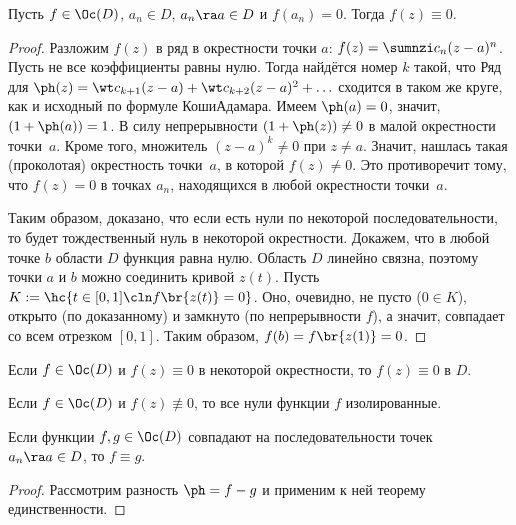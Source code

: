 \documentclass[a4paper]{article}
\begin{document}
\begin{theorem}[единственности]
Пусть $f \in \Oc(D)$, $a_{n} \in D$, $a_n \ra a \in D$ и $f(a_n)=0$. Тогда $f(z) \equiv 0$.
\end{theorem}
\begin{proof}
Разложим $f(z)$ в ряд в окрестности точки $a$: $f(z)=\sumnzi c_n(z-a)^n$.
Пусть не все коэффициенты равны нулю. Тогда найдётся номер $k$ такой, что
Ряд для $\ph(z) = \wt c_{k+1}(z-a) + \wt c_{k+2}(z-a)^2 + \ldots$ сходится в таком же круге, как и исходный
по формуле Коши\ч Адамара. Имеем $\ph(a) = 0$, значит, $(1+\ph(a))=1$. В силу непрерывности $(1+\ph(z))\neq 0$ в
малой окрестности точки~$a$. Кроме того, множитель $(z-a)^k \neq 0$ при $z \neq a$.
Значит, нашлась такая (проколотая) окрестность точки~$a$, в которой $f(z) \neq 0$. Это противоречит тому, что
$f(z) = 0$ в точках $a_n$, находящихся в любой окрестности точки~$a$.

Таким образом, доказано, что если есть нули по некоторой последовательности, то будет
тождественный нуль в некоторой окрестности. Докажем, что в любой точке $b$ области $D$ функция
равна нулю. Область $D$ линейно связна, поэтому точки $a$ и $b$ можно соединить кривой $z(t)$.
Пусть $K := \hc{t \in [0,1]\cln f\br{z(t)} = 0}$. Оно, очевидно, не пусто ($0 \in K$), открыто (по доказанному)
и замкнуто (по непрерывности $f$), а значит, совпадает со всем отрезком $[0,1]$. Таким образом, $f(b) = f\br{z(1)} = 0$.
\end{proof}
\begin{imp}
Если $f \in \Oc(D)$ и $f(z)\equiv 0$ в некоторой окрестности, то $f(z)\equiv 0$ в $D$.
\end{imp}
\begin{imp}
Если $f \in \Oc(D)$ и $f(z) \not\equiv 0$, то все нули функции $f$ изолированные.
\end{imp}
\begin{imp}
Если функции $f,g \in \Oc(D)$ совпадают на последовательности точек $a_n \ra a \in D$, то $f \equiv g$.
\end{imp}
\begin{proof}
Рассмотрим разность $\ph=f-g$ и применим к ней теорему единственности.
\end{proof}
\end{document}
